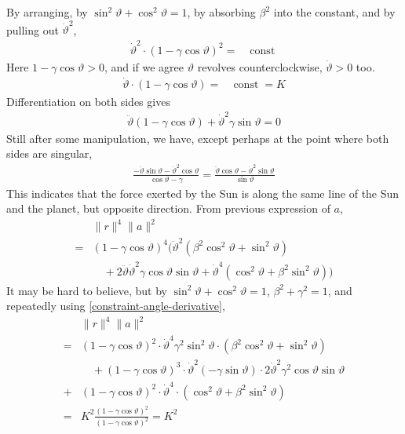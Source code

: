 \documentclass{article}
\newcommand{\Gb}{\beta}
\newcommand{\Gg}{\gamma}
\newcommand{\Gq}{\vartheta}
\newcommand{\Bd}{\cdot}
\newcommand{\Xqd}{\dot{\vartheta}}
\newcommand{\Xqdd}{\ddot{\vartheta}}
\newcommand{\Xs}{\sin \vartheta}
\newcommand{\Xc}{\cos \vartheta}
\newcommand{\Xss}{\sin^2 \vartheta}
\newcommand{\Xcc}{\cos^2 \vartheta}
\newcommand{\Tct}{\;\mathrm{const}\;}
\begin{document}
By arranging, by \(\Xss + \Xcc = 1\), by absorbing \(\Gb^2\) into the constant, and by pulling out \(\Xqd^2\),
\begin{align}
\Xqd^2 \Bd (1 - \Gg \Xc)^2
= &\Tct
\end{align}
Here \(1 - \Gg \Xc >0\), and if we agree \(\Gq\) revolves counterclockwise, \(\Xqd >0\) too.
\begin{align}
\Xqd \Bd (1 - \Gg \Xc)
= &\Tct = K
\end{align}
Differentiation on both sides gives
\begin{align}
\label{constraint-angle-derivative}
\Xqdd (1 - \Gg \Xc) +\Xqd^2 \Gg \Xs
= 0
\end{align}
Still after some manipulation, we have, except perhaps at the point
where both sides are singular,
\begin{align}
\frac {-\Xqdd \Xs -\Xqd^2 \Xc} {\Xc - \Gg}
=\frac {\Xqdd \Xc -\Xqd^2 \Xs} {\Xs}
\end{align}
This indicates that the force exerted by the Sun is along the same line 
of the Sun and the planet, but opposite direction.
From previous expression of \(a\),
\begin{align}
&\| r \| ^4 \| a \| ^2 \\
=&(1 - \Gg \Xc)^4
\Big(
\Xqdd^2 (\Gb^2 \Xcc + \Xss) \\
&\quad + 2 \Xqdd \Xqd^2 \Gg \Xc \Xs
+ \Xqd^4 (\Xcc + \Gb^2 \Xss)
\Big)
\end{align}
It may be hard to believe, but by \(\Xss + \Xcc = 1\), \(\Gb^2 + \Gg^2 = 1\), and repeatedly using \eqref{constraint-angle-derivative},
\begin{align}
&\| r \| ^4 \| a \| ^2 \\
=&(1 - \Gg \Xc)^2 \Bd \Xqd^4 \Gg^2 \Xss \Bd (\Gb^2 \Xcc + \Xss) \\
&\quad +(1 - \Gg \Xc)^3 \Bd \Xqd^2 (-\Gg \Xs) \Bd 2 \Xqd^2 \Gg^2 \Xc \Xs \\
+&(1 - \Gg \Xc)^2 \Bd \Xqd^4 \Bd (\Xcc + \Gb^2 \Xss) \\
=&K^2 \frac {(1 - \Gg \Xc)^2} {(1 - \Gg \Xc)^2} = K^2
\end{align}
\end{document}
